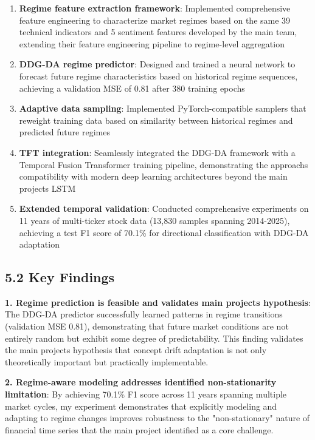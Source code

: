 \documentclass[
]{article}
\begin{document}
\begin{enumerate}
\def\labelenumi{\arabic{enumi}.}
\item
  \textbf{Regime feature extraction framework}: Implemented
  comprehensive feature engineering to characterize market regimes based
  on the same 39 technical indicators and 5 sentiment features developed
  by the main team, extending their feature engineering pipeline to
  regime-level aggregation
\item
  \textbf{DDG-DA regime predictor}: Designed and trained a neural
  network to forecast future regime characteristics based on historical
  regime sequences, achieving a validation MSE of 0.81 after 380
  training epochs
\item
  \textbf{Adaptive data sampling}: Implemented PyTorch-compatible
  samplers that reweight training data based on similarity between
  historical regimes and predicted future regimes
\item
  \textbf{TFT integration}: Seamlessly integrated the DDG-DA framework
  with a Temporal Fusion Transformer training pipeline, demonstrating
  the approach\textquotesingle s compatibility with modern deep learning
  architectures beyond the main project\textquotesingle s LSTM
\item
  \textbf{Extended temporal validation}: Conducted comprehensive
  experiments on 11 years of multi-ticker stock data (13,830 samples
  spanning 2014-2025), achieving a test F1 score of 70.1\% for
  directional classification with DDG-DA adaptation
\end{enumerate}

\subsection{5.2 Key Findings}\label{52-key-findings}

\textbf{1. Regime prediction is feasible and validates main
project\textquotesingle s hypothesis}: The DDG-DA predictor successfully
learned patterns in regime transitions (validation MSE 0.81),
demonstrating that future market conditions are not entirely random but
exhibit some degree of predictability. This finding validates the main
project\textquotesingle s hypothesis that concept drift adaptation is
not only theoretically important but practically implementable.

\textbf{2. Regime-aware modeling addresses identified non-stationarity
limitation}: By achieving 70.1\% F1 score across 11 years spanning
multiple market cycles, my experiment demonstrates that explicitly
modeling and adapting to regime changes improves robustness to the
"non-stationary" nature of financial time series that the main project
identified as a core challenge.
\end{document}
